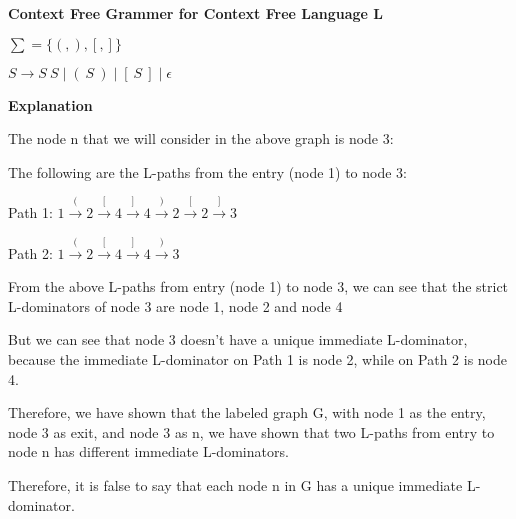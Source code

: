 \documentclass[12pt]{article}
\begin{document}
\begin{enumerate}
\begin{mdframed}
\begin{tikzpicture}[
          ->,
          vertex/.style={circle, draw, minimum size=1cm},
          node distance=2cm and 2cm
        ]
      \end{tikzpicture}

      \textbf{Context Free Grammer for Context Free Language L}

      $ \sum = \{(, ), [, ]\} $

      $ S \rightarrow S \: S \mid ( \: S \: ) \mid [ \: S \: ] \mid \epsilon $

      \textbf{Explanation}

      The node n that we will consider in the above graph is node 3:

      The following are the L-paths from the entry (node 1) to node 3:

      Path 1: $1 \xrightarrow{(} 2 \xrightarrow{[} 4 \xrightarrow{]} 4 \xrightarrow{)} 2 \xrightarrow{[} 2 \xrightarrow{]} 3$
      
      Path 2: $1 \xrightarrow{(} 2 \xrightarrow{[} 4 \xrightarrow{]} 4 \xrightarrow{)} 3$

      From the above L-paths from entry (node 1) to node 3, we can see that the strict L-dominators of node 3 are node 1, node 2 and node 4

      But we can see that node 3 doesn't have a unique immediate L-dominator, because the immediate L-dominator on Path 1 is node 2, while on Path 2 is node 4.

      Therefore, we have shown that the labeled graph G, with node 1 as the entry, node 3 as exit, and node 3 as n, we have shown that two L-paths from entry to node n has different immediate L-dominators.

      Therefore, it is false to say that each node n in G has a unique immediate L-dominator.
      \end{mdframed}
      
  \end{enumerate}
    
\end{document}

